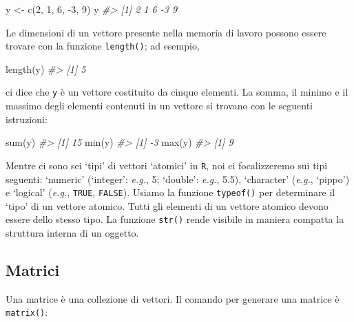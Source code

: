 \documentclass[
]{memoir}
\newenvironment{Shaded}{\begin{snugshade}}{\end{snugshade}}
\newcommand{\CommentTok}[1]{\textcolor[rgb]{0.56,0.35,0.01}{\textit{#1}}}
\newcommand{\DecValTok}[1]{\textcolor[rgb]{0.00,0.00,0.81}{#1}}
\newcommand{\FunctionTok}[1]{\textcolor[rgb]{0.00,0.00,0.00}{#1}}
\newcommand{\NormalTok}[1]{#1}
\newcommand{\OtherTok}[1]{\textcolor[rgb]{0.56,0.35,0.01}{#1}}
\newcommand{\SpecialCharTok}[1]{\textcolor[rgb]{0.00,0.00,0.00}{#1}}
\theoremstyle{definition}
\theoremstyle{definition}
\theoremstyle{definition}
\theoremstyle{definition}
\theoremstyle{remark}
\begin{document}
\begin{Shaded}
\begin{Highlighting}[]
\NormalTok{y }\OtherTok{\textless{}{-}} \FunctionTok{c}\NormalTok{(}\DecValTok{2}\NormalTok{, }\DecValTok{1}\NormalTok{, }\DecValTok{6}\NormalTok{, }\SpecialCharTok{{-}}\DecValTok{3}\NormalTok{, }\DecValTok{9}\NormalTok{)}
\NormalTok{y}
\CommentTok{\#\textgreater{} [1]  2  1  6 {-}3  9}
\end{Highlighting}
\end{Shaded}

Le dimensioni di un vettore presente nella memoria di lavoro possono essere trovare con la funzione \texttt{length()}; ad esempio,

\begin{Shaded}
\begin{Highlighting}[]
\FunctionTok{length}\NormalTok{(y)}
\CommentTok{\#\textgreater{} [1] 5}
\end{Highlighting}
\end{Shaded}

ci dice che \texttt{y} è un vettore costituito da cinque elementi. La somma, il
minimo e il massimo degli elementi contenuti in un vettore si trovano
con le seguenti istruzioni:

\begin{Shaded}
\begin{Highlighting}[]
\FunctionTok{sum}\NormalTok{(y)}
\CommentTok{\#\textgreater{} [1] 15}
\FunctionTok{min}\NormalTok{(y)}
\CommentTok{\#\textgreater{} [1] {-}3}
\FunctionTok{max}\NormalTok{(y)}
\CommentTok{\#\textgreater{} [1] 9}
\end{Highlighting}
\end{Shaded}

Mentre ci sono sei `tipi' di vettori `atomici' in \texttt{R}, noi ci
focalizzeremo sui tipi seguenti: `numeric' (`integer': \emph{e.g.}, 5;
`double': \emph{e.g.}, 5.5), `character' (\emph{e.g.}, `pippo') e `logical'
(\emph{e.g.}, \texttt{TRUE}, \texttt{FALSE}). Usiamo la funzione \texttt{typeof()} per determinare
il `tipo' di un vettore atomico. Tutti gli elementi di un vettore
atomico devono essere dello stesso tipo. La funzione \texttt{str()} rende
visibile in maniera compatta la struttura interna di un oggetto.

\hypertarget{matrici}{%
\subsection{Matrici}\label{matrici}}

Una matrice è una collezione di vettori. Il comando per generare una
matrice è \texttt{matrix()}:
\end{document}
